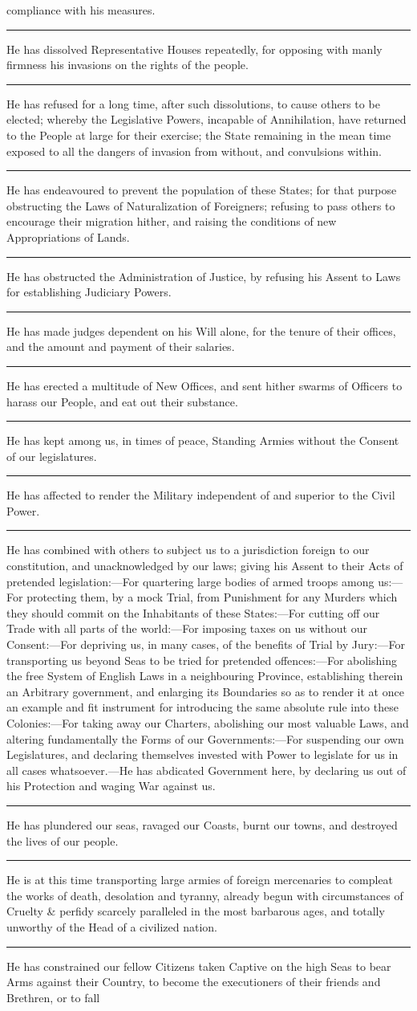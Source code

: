 \documentclass{article}
\begin{document}
compliance with his measures.\rule[.5ex]{2em}{.2pt}He has dissolved Representative Houses repeatedly, for opposing with manly firmness his invasions on the rights of the people.\rule[.5ex]{2em}{.2pt}He has refused for a long time, after such dissolutions, to cause others to be elected; whereby the Legislative Powers, incapable of Annihilation, have returned to the People at large for their exercise; the State remaining in the mean time exposed to all the dangers of invasion from without, and convulsions within.\rule[.5ex]{2em}{.2pt}He has endeavoured to prevent the population of these States; for that purpose obstructing the Laws of Naturalization of Foreigners; refusing to pass others to encourage their migration hither, and raising the conditions of new Appropriations of Lands.\rule[.5ex]{2em}{.2pt}He has obstructed the Administration of Justice, by refusing his Assent to Laws for establishing Judiciary Powers.\rule[.5ex]{2em}{.2pt}He has made judges dependent on his Will alone, for the tenure of their offices, and the amount and payment of their salaries.\rule[.5ex]{2em}{.2pt}He has erected a multitude of New Offices, and sent hither swarms of Officers to harass our People, and eat out their substance.\rule[.5ex]{2em}{.2pt}He has kept among us, in times of peace, Standing Armies without the Consent of our legislatures.\rule[.5ex]{2em}{.2pt}He has affected to render the Military independent of and superior to the Civil Power.\rule[.5ex]{2em}{.2pt}He has combined with others to subject us to a jurisdiction foreign to our constitution, and unacknowledged by our laws; giving his Assent to their Acts of pretended legislation:---For quartering large bodies of armed troops among us:---For protecting them, by a mock Trial, from Punishment for any Murders which they should commit on the Inhabitants of these States:---For cutting off our Trade with all parts of the world:---For imposing taxes on us without our Consent:---For depriving us, in many cases, of the benefits of Trial by Jury:---For transporting us beyond Seas to be tried for pretended offences:---For abolishing the free System of English Laws in a neighbouring Province, establishing therein an Arbitrary government, and enlarging its Boundaries so as to render it at once an example and fit instrument for introducing the same absolute rule into these Colonies:---For taking away our Charters, abolishing our most valuable Laws, and altering fundamentally the Forms of our Governments:---For suspending our own Legislatures, and declaring themselves invested with Power to legislate for us in all cases whatsoever.---He has abdicated Government here, by declaring us out of his Protection and waging War against us.\rule[.5ex]{2em}{.2pt}He has plundered our seas, ravaged our Coasts, burnt our towns, and destroyed the lives of our people.\rule[.5ex]{2em}{.2pt}He is at this time transporting large armies of foreign mercenaries to compleat the works of death, desolation and tyranny, already begun with circumstances of Cruelty \& perfidy scarcely paralleled in the most barbarous ages, and totally unworthy of the Head of a civilized nation.\rule[.5ex]{2em}{.2pt}He has constrained our fellow Citizens taken Captive on the high Seas to bear Arms against their Country, to become the executioners of their friends and Brethren, or to fall 
\end{document}
